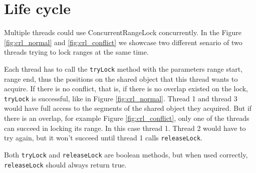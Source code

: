 \section{Life cycle}

Multiple threads could use ConcurrentRangeLock concurrently. 
In the Figure \ref{fig:crl_normal} and \ref{fig:crl_conflict} we showcase two different senario of two threads trying to lock ranges at the same time. 

Each thread has to call the \texttt{tryLock} method with the parameters range start, range end, thus the positions on the shared object that this thread wants to acquire. 
If there is no conflict, that is, if there is no overlap existed on the lock, \texttt{tryLock} is successful, like in Figure \ref{fig:crl_normal}. 
Thread 1 and thread 3 would have full access to the segments of the shared object they acquired.
But if there is an overlap, for example Figure \ref{fig:crl_conflict}, only one of the threads can succeed in locking its range.
In this case thread 1. Thread 2 would have to try again, but it won't succeed until thread 1 calls \texttt{releaseLock}.

Both \texttt{tryLock} and \texttt{releaseLock} are boolean methods, but when used correctly, \texttt{releaseLock} should always return true.


